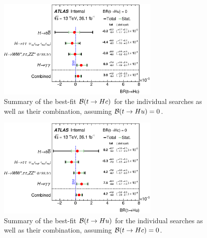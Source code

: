 \begin{figure}[t!]
\begin{center}
\includegraphics[width=0.7\textwidth]{figures/Combo/POI.eps}
\caption{\small {Summary of the best-fit $\mathcal{B}(t\to Hc)$ for the individual searches as well as their combination,
assuming $\mathcal{B}(t\to Hu)=0$. }}
\label{fig:summary_printnum_hc} 
\end{center}
\end{figure}
\begin{figure}[h!]
\begin{center}
\includegraphics[width=0.7\textwidth]{figures/Combo/POI2.eps}
\caption{\small {Summary of the best-fit $\mathcal{B}(t\to Hu)$ for the individual searches as well as their combination,
assuming $\mathcal{B}(t\to Hc)=0$. }}
\label{fig:summary_printnum_hu} 
\end{center}
\end{figure}

